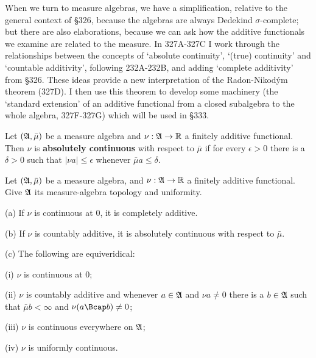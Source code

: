 
\def\chaptername{Measure algebras}
\def\sectionname{Additive functionals on measure algebras}


When we turn to measure algebras, we have a simplification, relative to
the general context of \S326, because the algebras are always
Dedekind $\sigma$-complete;  but there are also elaborations, because we
can ask how the additive functionals we examine are related to the
measure.   In 327A-327C I work through the relationships between the
concepts of `absolute continuity', `(true) continuity' and
`countable additivity', following 232A-232B, and adding
`complete additivity' from \S326.   These ideas provide a new
interpretation of the Radon-Nikod\'ym theorem (327D).
I then use this theorem to develop some machinery (the `standard
extension' of an additive functional from a closed subalgebra to the
whole algebra, 327F-327G) which will be used in \S333.

 Let $(\frak A,\bar\mu)$ be a measure algebra
and $\nu:\frak A\to\Bbb R$ a finitely additive functional.   Then $\nu$
is {\bf absolutely continuous} with respect to $\bar\mu$ if for every
$\epsilon>0$ there is a $\delta>0$ such that $|\nu a|\le\epsilon$
whenever $\bar\mu a\le\delta$.

 Let $(\frak A,\bar\mu)$ be a measure algebra, and
$\nu:\frak A\to\Bbb R$ a finitely additive functional.   Give $\frak A$
its measure-algebra topology and uniformity.

(a) If $\nu$ is continuous at $0$, it is completely additive.

(b) If $\nu$ is countably additive, it is absolutely continuous with
respect to $\bar\mu$.

(c) The following are equiveridical:

\quad(i) $\nu$ is continuous at $0$;

\quad(ii) $\nu$ is countably additive and whenever $a\in\frak A$ and
$\nu a\ne 0$ there is a $b\in\frak A$ such that $\bar\mu b<\infty$ and
$\nu(a\Bcap b)\ne 0$;

\quad(iii) $\nu$ is continuous everywhere on $\frak A$;

\quad(iv) $\nu$ is uniformly continuous.

